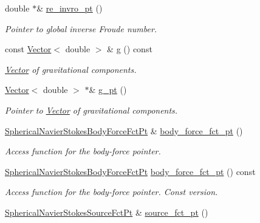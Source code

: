 \begin{DoxyCompactItemize}
double $\ast$\& \hyperlink{classoomph_1_1SphericalNavierStokesEquations_a90f9fc0e4ed20ad28395e838106dc97d}{re\+\_\+invro\+\_\+pt} ()
\begin{DoxyCompactList}\small\item\em Pointer to global inverse Froude number. \end{DoxyCompactList}\item 
const \hyperlink{classoomph_1_1Vector}{Vector}$<$ double $>$ \& \hyperlink{classoomph_1_1SphericalNavierStokesEquations_ac580f29734c9595980428b8324099d7d}{g} () const
\begin{DoxyCompactList}\small\item\em \hyperlink{classoomph_1_1Vector}{Vector} of gravitational components. \end{DoxyCompactList}\item 
\hyperlink{classoomph_1_1Vector}{Vector}$<$ double $>$ $\ast$\& \hyperlink{classoomph_1_1SphericalNavierStokesEquations_abf7999df2161b8a7b14ca10352b27468}{g\+\_\+pt} ()
\begin{DoxyCompactList}\small\item\em Pointer to \hyperlink{classoomph_1_1Vector}{Vector} of gravitational components. \end{DoxyCompactList}\item 
\hyperlink{classoomph_1_1SphericalNavierStokesEquations_aee36bea87063e9648a488de9e21f551d}{Spherical\+Navier\+Stokes\+Body\+Force\+Fct\+Pt} \& \hyperlink{classoomph_1_1SphericalNavierStokesEquations_af8453d00310f9e090ad466fe1b93ca36}{body\+\_\+force\+\_\+fct\+\_\+pt} ()
\begin{DoxyCompactList}\small\item\em Access function for the body-\/force pointer. \end{DoxyCompactList}\item 
\hyperlink{classoomph_1_1SphericalNavierStokesEquations_aee36bea87063e9648a488de9e21f551d}{Spherical\+Navier\+Stokes\+Body\+Force\+Fct\+Pt} \hyperlink{classoomph_1_1SphericalNavierStokesEquations_a8a0362d47e0d6b757b21520b8d2026c6}{body\+\_\+force\+\_\+fct\+\_\+pt} () const
\begin{DoxyCompactList}\small\item\em Access function for the body-\/force pointer. Const version. \end{DoxyCompactList}\item 
\hyperlink{classoomph_1_1SphericalNavierStokesEquations_abd522fea532c3de15dbe80205e53bdf8}{Spherical\+Navier\+Stokes\+Source\+Fct\+Pt} \& \hyperlink{classoomph_1_1SphericalNavierStokesEquations_a043b034d3113a7e7aabb058fd950f90c}{source\+\_\+fct\+\_\+pt} ()

\end{DoxyCompactItemize}
